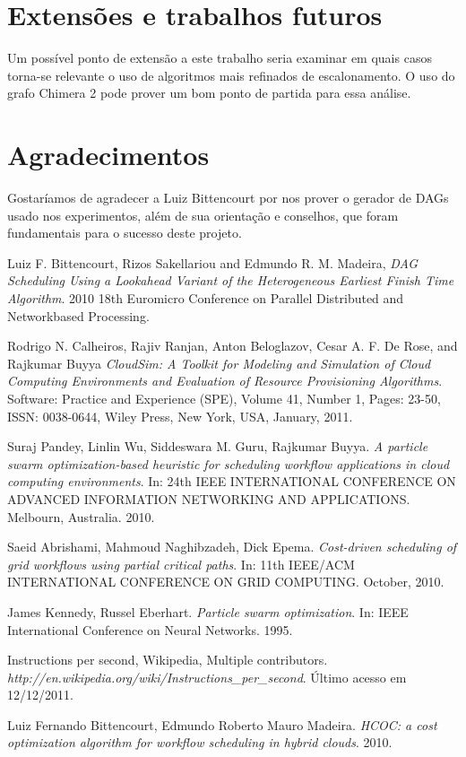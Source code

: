 \documentclass[a4paper,10pt]{article}
\begin{document}
\section{Extensões e trabalhos futuros}

Um possível ponto de extensão a este trabalho seria examinar em quais casos torna-se relevante o uso
de algoritmos mais refinados de escalonamento. O uso do grafo Chimera 2 pode prover um bom ponto de
partida para essa análise.

\section{Agradecimentos}

Gostaríamos de agradecer a Luiz Bittencourt por nos
prover o gerador de DAGs usado nos experimentos, além de sua orientação e
conselhos, que foram fundamentais para o sucesso deste projeto.

\begin{thebibliography}{9}

  Luiz F. Bittencourt, Rizos Sakellariou and Edmundo R. M. Madeira,
  \emph{DAG Scheduling Using a Lookahead Variant
of the Heterogeneous Earliest Finish Time Algorithm}.
  2010 18th Euromicro Conference on Parallel Distributed and Networkbased Processing.

  Rodrigo N. Calheiros, Rajiv Ranjan, Anton Beloglazov, Cesar A. F. De Rose, and Rajkumar Buyya
  \emph{CloudSim: A Toolkit for Modeling and Simulation of Cloud Computing Environments and Evaluation of Resource Provisioning Algorithms}.
  Software: Practice and Experience (SPE),
  Volume 41, Number 1, Pages: 23-50, ISSN: 0038-0644,
  Wiley Press, New York, USA, January, 2011.

  Suraj Pandey, Linlin Wu, Siddeswara M. Guru, Rajkumar Buyya.
  \emph{A particle swarm    optimization-based heuristic for scheduling workflow applications in cloud computing environments}. 
  In: 24th IEEE INTERNATIONAL CONFERENCE ON ADVANCED INFORMATION NETWORKING AND APPLICATIONS. Melbourn, Australia. 2010.               

  Saeid Abrishami, Mahmoud Naghibzadeh, Dick Epema. 
  \emph{Cost-driven scheduling of grid workflows using partial critical paths}. 
  In: 11th IEEE/ACM INTERNATIONAL CONFERENCE ON GRID COMPUTING. October, 2010.
                                                    

   James Kennedy, Russel Eberhart. 
   \emph{Particle swarm optimization}. 
   In: IEEE International Conference on Neural Networks. 1995.

   Instructions per second, Wikipedia, Multiple contributors.
   \emph{http://en.wikipedia.org/wiki/Instructions\_per\_second}. 
   Último acesso em 12/12/2011.

   Luiz Fernando Bittencourt, Edmundo Roberto Mauro Madeira.
   \emph{HCOC: a cost optimization algorithm for workflow scheduling in hybrid clouds}. 2010.
 

\end{thebibliography}
\end{document}
